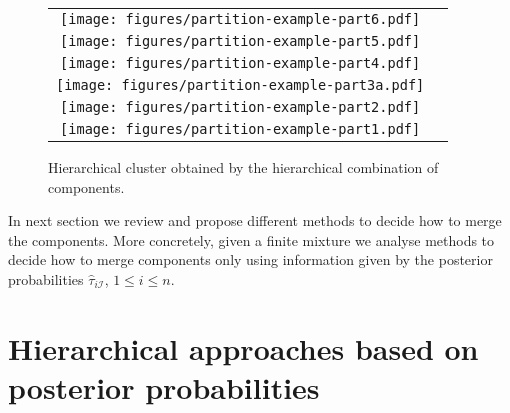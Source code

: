 \documentclass[10pt, a4paper]{article}
\begin{document}
\begin{figure}[thbp]
\begin{center}
\begin{tabular}{cc}
  \texttt{[image: figures/partition-example-part6.pdf]} \\
    \texttt{[image: figures/partition-example-part5.pdf]} \\
      \texttt{[image: figures/partition-example-part4.pdf]} \\
        \texttt{[image: figures/partition-example-part3a.pdf]} \\
          \texttt{[image: figures/partition-example-part2.pdf]} \\
            \texttt{[image: figures/partition-example-part1.pdf]}
 \end{tabular}
 \caption{Hierarchical cluster obtained by the hierarchical combination of components.}\label{hierarchical}
\end{center}
\end{figure}

In next section we review and propose different methods to decide how to merge the components. More concretely, given a finite mixture we analyse methods to decide how to merge components only using information given by the posterior probabilities $\hat{\tau}_{i \mathcal{I}}$, $1\leq i \leq n$.



\section{Hierarchical approaches based on posterior probabilities}
\label{old_methods}

\end{document}
